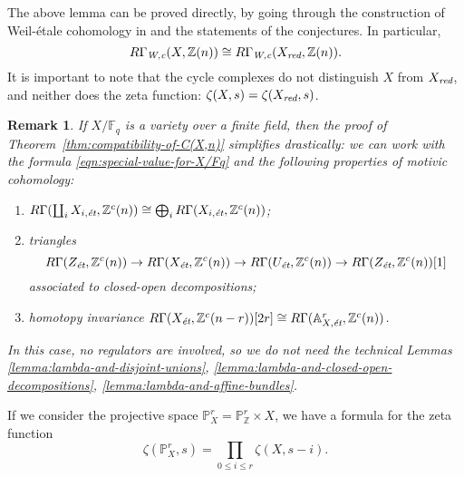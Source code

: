 \documentclass[10pt,a4paper,oneside,draft]{article}
\newcommand{\FF}{\mathbb{F}}
\newcommand{\ZZ}{\mathbb{Z}}
\renewcommand{\AA}{\mathbb{A}}
\newcommand{\PP}{\mathbb{P}}
\newcommand{\et}{\text{\it \'{e}t}}
\newcommand{\red}{\text{\it red}}
\newcommand{\Wc}{\text{\it W,c}}
\theoremstyle{myplain}
\theoremstyle{mydefinition}
\newtheorem{remark}[theorem]{Remark}
\numberwithin{equation}{section}
\begin{document}
The above lemma can be proved directly, by going through the construction of
Weil-\'{e}tale cohomology in \cite{Beshenov-Weil-etale-1} and the statements of
the conjectures. In particular,
$$R\Gamma_\Wc (X, \ZZ(n)) \cong R\Gamma_\Wc (X_\red, \ZZ(n)).$$
It is important to note that the cycle complexes do not distinguish $X$ from
$X_\red$, and neither does the zeta function: $\zeta (X,s) = \zeta (X_\red,s)$.

\begin{remark}
  If $X/\FF_q$ is a variety over a finite field, then the proof of
  Theorem~\ref{thm:compatibility-of-C(X,n)} simplifies drastically: we can work
  with the formula \eqref{eqn:special-value-for-X/Fq} and the following
  properties of motivic cohomology:
  \begin{enumerate}
  \item[1)] $R\Gamma (\coprod_i X_{i,\et}, \ZZ^c (n)) \cong
    \bigoplus_i R\Gamma (X_{i,\et}, \ZZ^c (n))$;

  \item[2)] triangles
    \[ R\Gamma (Z_\et, \ZZ^c (n)) \to
      R\Gamma (X_\et, \ZZ^c (n)) \to
      R\Gamma (U_\et, \ZZ^c (n)) \to
      R\Gamma (Z_\et, \ZZ^c (n))[1] \]
    associated to closed-open decompositions;

  \item[3)] homotopy invariance
    $R\Gamma (X_\et, \ZZ^c (n-r)) [2r] \cong
    R\Gamma (\AA^r_{X,\et}, \ZZ^c (n))$.
  \end{enumerate}
  In this case, no regulators are involved, so we do not need the technical
  Lemmas \ref{lemma:lambda-and-disjoint-unions},
  \ref{lemma:lambda-and-closed-open-decompositions},
  \ref{lemma:lambda-and-affine-bundles}.
\end{remark}

If we consider the projective space $\PP_X^r = \PP_\ZZ^r \times X$, we have a
formula for the zeta function
\begin{equation}
  \label{eqn:zeta-function-for-projective-space}
  \zeta (\PP_X^r, s) = \prod_{0 \le i \le r} \zeta (X, s-i).
\end{equation}
\end{document}
